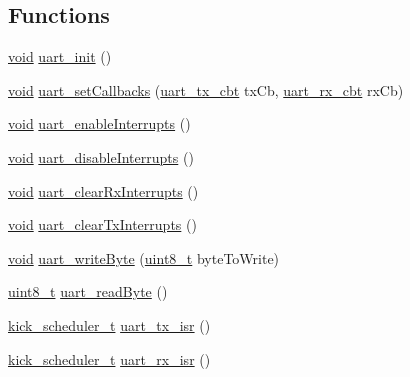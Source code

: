 \subsection*{Functions}
\begin{DoxyCompactItemize}
\item 
\hyperlink{usb__devapi_8h_afabf60e7f57651d6d595a02c75f07cd0}{void} \hyperlink{group__uart_ga0c0ca72359ddf28dcd15900dfba19343}{uart\+\_\+init} ()
\item 
\hyperlink{usb__devapi_8h_afabf60e7f57651d6d595a02c75f07cd0}{void} \hyperlink{group__uart_ga9a390382a1fb16e9d83c1f5a34afb6e3}{uart\+\_\+set\+Callbacks} (\hyperlink{group__uart_gae005b96f0b18aecb814f4979c3e33408}{uart\+\_\+tx\+\_\+cbt} tx\+Cb, \hyperlink{group__uart_gab8f8d6449d6a994dfb5ede3fca7ac4e2}{uart\+\_\+rx\+\_\+cbt} rx\+Cb)
\item 
\hyperlink{usb__devapi_8h_afabf60e7f57651d6d595a02c75f07cd0}{void} \hyperlink{group__uart_ga19d6ac545de3750804fcdd7d5c6ae41e}{uart\+\_\+enable\+Interrupts} ()
\item 
\hyperlink{usb__devapi_8h_afabf60e7f57651d6d595a02c75f07cd0}{void} \hyperlink{group__uart_ga138d10923b5872cc48a30802f9a85308}{uart\+\_\+disable\+Interrupts} ()
\item 
\hyperlink{usb__devapi_8h_afabf60e7f57651d6d595a02c75f07cd0}{void} \hyperlink{group__uart_gad4ce3cb232f8a2a473976527d3497fc6}{uart\+\_\+clear\+Rx\+Interrupts} ()
\item 
\hyperlink{usb__devapi_8h_afabf60e7f57651d6d595a02c75f07cd0}{void} \hyperlink{group__uart_gae5f8c18830d4a12c2ccd5aaab95aa563}{uart\+\_\+clear\+Tx\+Interrupts} ()
\item 
\hyperlink{usb__devapi_8h_afabf60e7f57651d6d595a02c75f07cd0}{void} \hyperlink{group__uart_ga7a4111d6f4c172637301fe00e344e77f}{uart\+\_\+write\+Byte} (\hyperlink{_p_e___types_8h_aba7bc1797add20fe3efdf37ced1182c5}{uint8\+\_\+t} byte\+To\+Write)
\item 
\hyperlink{_p_e___types_8h_aba7bc1797add20fe3efdf37ced1182c5}{uint8\+\_\+t} \hyperlink{group__uart_ga9b9f9e22d7f34dd0a2fe9c3456d12987}{uart\+\_\+read\+Byte} ()
\item 
\hyperlink{group__board_gac9ebdcc0a4f3c8422f5f4f0fbbe0ded0}{kick\+\_\+scheduler\+\_\+t} \hyperlink{group__uart_ga20f850e163363a82ca205c9fdba31860}{uart\+\_\+tx\+\_\+isr} ()
\item 
\hyperlink{group__board_gac9ebdcc0a4f3c8422f5f4f0fbbe0ded0}{kick\+\_\+scheduler\+\_\+t} \hyperlink{group__uart_ga0c9173d92e6ad1afee36bf6face8d92e}{uart\+\_\+rx\+\_\+isr} ()
\end{DoxyCompactItemize}
